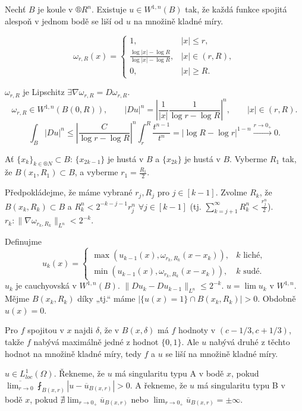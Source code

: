 \documentclass[12pt]{article}					%
\begin{document}
\begin{veta}
	Nechť $B$ je koule v $®R^n$. Existuje $u \in W^{1, n}(B)$ tak, že každá funkce spojitá alespoň v jednom bodě se liší od $u$ na množině kladné míry.

	\begin{dukazin}
		$$ ω_{r, R}(x) = \begin{cases}1, & |x| ≤ r,\\\frac{\log |x| - \log R}{\log |x| - \log R}, & |x| \in (r, R),\\0, & |x| ≥ R.\end{cases} $$

		$ω_{r, R}$ je Lipschitz $\exists \nabla ω_{r, R} = Dω_{r, R}$.
		$$ ω_{r, R} \in W^{1, n}(B(0, R)), \qquad |Du|^n = \left| \frac{1}{|x|} \frac{1}{\log r - \log R}\right|^n, \qquad |x| \in (r, R). $$
		$$ \int_B |Du|^n ≤ \left| \frac{C}{\log r - \log R}\right|^n \int_r^R \frac{t^{n-1}}{t^n} = |\log R - \log r|^{1 - n} \overset{r \rightarrow 0_+}\longrightarrow 0. $$

		Ať $\{x_k\}_{k \in ®N} \subset B$: $\{x_{2k-1}\}$ je hustá v $B$ a $\{x_{2k}\}$ je hustá v $B$. Vyberme $R_1$ tak, že $B(x_1, R_1) \subset B$, a vyberme $r_1 = \frac{R_1}{2}$.

		Předpokládejme, že máme vybrané $r_j, R_j$ pro $j \in [k-1]$. Zvolme $R_k$, že $B(x_k, R_k) \subset B$ a $R_k^n < 2^{-k-j-1} r_j^n$ $\forall j \in [k-1]$ (tj. $\sum_{k=j+1}^∞ R_k^n < \frac{r_j^n}{2}$). $r_k: \|\nabla ω_{r_k, R_k}\|_{L^n} < 2^{-k}$. 

		Definujme
		$$ u_k(x) = \begin{cases}\max(u_{k-1}(x), ω_{r_k, R_k}(x - x_k)),& k \text{ liché},\\ \min(u_{k-1}(x), ω_{r_k, R_k}(x - x_k)), & k \text{ sudé}.\end{cases} $$
		$u_k$ je cauchyovská v $W^{1, n}(B)$. $\|Du_k - Du_{k-1}\|_{L^n} ≤ 2^{-k}$. $u = \lim u_k$ v $W^{1, n}$. Mějme $B(x_k, R_k)$ díky „tj.“ máme $|\{u(x) = 1\} \cap B(x_k, R_k)| > 0$. Obdobně $u(x) = 0$.

		Pro $f$ spojitou v $x$ najdi $δ$, že v $B(x, δ)$ má $f$ hodnoty v $(c - 1 / 3, c + 1 / 3)$, takže $f$ nabývá maximálně jedné z hodnot $\{0, 1\}$. Ale $u$ nabývá druhé z těchto hodnot na množině kladné míry, tedy $f$ a $u$ se liší na množině kladné míry.
	\end{dukazin}
\end{veta}

\begin{definice}
	$u \in L^1_{loc}(Ω)$. Řekneme, že $u$ má singularitu typu A v bodě $x$, pokud $\overline{\lim_{r \rightarrow 0}} \fint_{B(x, r)} |u - \overline{u}_{B(x, r)}| > 0$. A řekneme, že $u$ má singularitu typu B v bodě $x$, pokud $\nexists \lim_{r \rightarrow 0_+} \overline{u}_{B(x, r)}$ nebo $\lim_{r \rightarrow 0_+} \overline{u}_{B(x, r)} = ± ∞$.
\end{definice}
\end{document}
